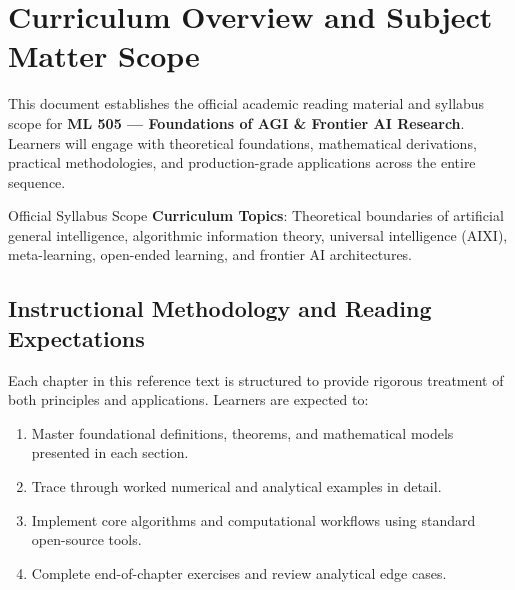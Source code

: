 \section{Curriculum Overview and Subject Matter Scope}

This document establishes the official academic reading material and syllabus scope for \textbf{ML 505 --- Foundations of AGI \& Frontier AI Research}. Learners will engage with theoretical foundations, mathematical derivations, practical methodologies, and production-grade applications across the entire sequence.

\begin{InsightBox}{Official Syllabus Scope}
  \textbf{Curriculum Topics}: Theoretical boundaries of artificial general intelligence, algorithmic information theory, universal intelligence (AIXI), meta-learning, open-ended learning, and frontier AI architectures.
\end{InsightBox}

\subsection{Instructional Methodology and Reading Expectations}

Each chapter in this reference text is structured to provide rigorous treatment of both principles and applications. Learners are expected to:
\begin{enumerate}
  \item Master foundational definitions, theorems, and mathematical models presented in each section.
  \item Trace through worked numerical and analytical examples in detail.
  \item Implement core algorithms and computational workflows using standard open-source tools.
  \item Complete end-of-chapter exercises and review analytical edge cases.
\end{enumerate}

